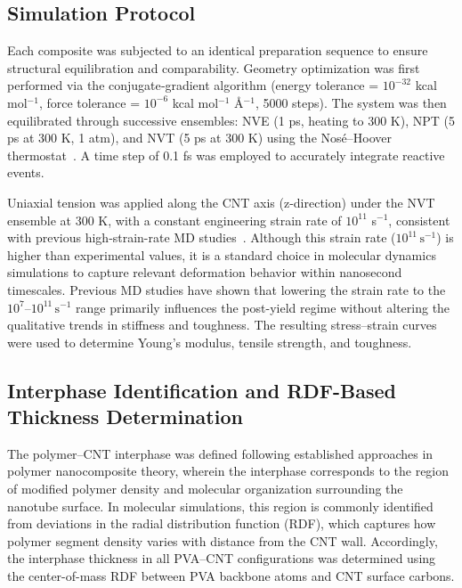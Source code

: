\documentclass[journal=jacsat,manuscript=article]{achemso}
\begin{document}
\subsection{Simulation Protocol}

Each composite was subjected to an identical preparation sequence to ensure structural equilibration and comparability. Geometry optimization was first performed via the conjugate‐gradient algorithm (energy tolerance = $10^{-32}$ kcal mol$^{-1}$, force tolerance = $10^{-6}$ kcal mol$^{-1}$ Å$^{-1}$, 5000 steps). The system was then equilibrated through successive ensembles: NVE (1 ps, heating to 300 K), NPT (5 ps at 300 K, 1 atm), and NVT (5 ps at 300 K) using the Nosé–Hoover thermostat~\cite{plimpton1995fast}. A time step of 0.1 fs was employed to accurately integrate reactive events.

Uniaxial tension was applied along the CNT axis (z-direction) under the NVT ensemble at 300 K, with a constant engineering strain rate of $10^{11}$ s$^{-1}$, consistent with previous high‐strain-rate MD studies~\cite{dupont2012strain}. Although this strain rate ($10^{11}\,\mathrm{s^{-1}}$) is higher than experimental values, it is a standard choice in molecular dynamics simulations to capture relevant deformation behavior within nanosecond timescales. Previous MD studies have shown that lowering the strain rate to the $10^{7}$–$10^{11}\,\mathrm{s^{-1}}$ range primarily influences the post-yield regime without altering the qualitative trends in stiffness and toughness\cite{youssef2024unraveling}.
The resulting stress–strain curves were used to determine Young’s modulus, tensile strength, and toughness.


\subsection{Interphase Identification and RDF-Based Thickness Determination}

The polymer--CNT interphase was defined following established approaches in 
polymer nanocomposite theory, wherein the interphase corresponds to the region of 
modified polymer density and molecular organization surrounding the nanotube 
surface\cite{huang2022interphase}. In molecular simulations, this 
region is commonly identified from deviations in the radial distribution function 
(RDF), which captures how polymer segment density varies with distance from the 
CNT wall. Accordingly, the interphase thickness in all PVA--CNT configurations 
was determined using the center-of-mass RDF between PVA backbone atoms and CNT 
surface carbons.
\end{document}
